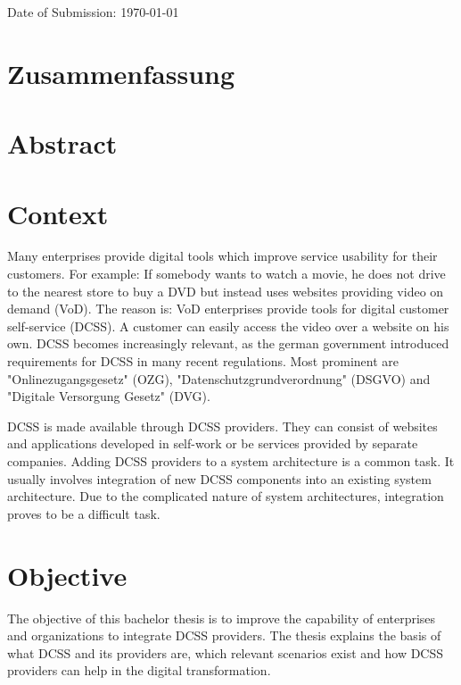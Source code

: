 \documentclass[
     12pt,         %
     a4paper,      %
     BCOR10mm,     %
     DIV14,        %
aragraph skip instad of paragraph indent
     ]{scrreprt}
\begin{document}
\medskip
\noindent
Date of Submission: \today
\newpage

\chapter*{Zusammenfassung}

\newpage

\chapter*{Abstract}

\newpage

\tableofcontents
\cleardoublepage
{}

\chapter{Context}

Many enterprises provide digital tools which improve service usability for their customers. For example: If somebody wants to watch a movie, he does 
not drive to the nearest store to buy a DVD but instead uses websites providing video on demand (VoD). The reason is: 
VoD enterprises provide tools for digital customer self-service (DCSS). A customer can easily access the video over a website on his own.
DCSS becomes increasingly relevant, as the german government introduced requirements for DCSS in many recent regulations. 
Most prominent are  "Onlinezugangsgesetz" (OZG), "Datenschutzgrundverordnung" (DSGVO) and "Digitale Versorgung Gesetz" (DVG). 

DCSS is made available through DCSS providers. They can consist of websites and applications developed in self-work or be 
services provided by separate companies. Adding DCSS providers to a system architecture is a common task. It usually involves integration 
of new DCSS components into an existing system architecture. Due to the complicated nature of system architectures, integration proves to 
be a difficult task.

\chapter{Objective}


The objective of this bachelor thesis is to improve the capability of enterprises and organizations to integrate DCSS providers.
The thesis explains the basis of what DCSS and its providers are, which relevant scenarios exist and how DCSS providers can help
in the digital transformation.
\end{document}
